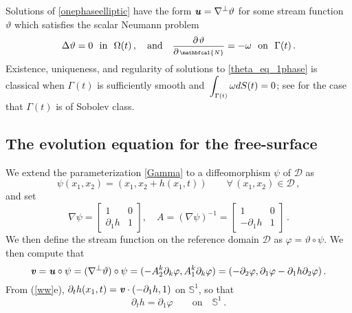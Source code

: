 \documentclass[11pt]{article}
\theoremstyle{plain}
\theoremstyle{definition}
\theoremstyle{definition}
\def\D{{\mathcal D}}
\def\p{\text{\bf\emph{p}}}
\def\u{\text{\bf\emph{u}}}
\def\v{\text{\bf\emph{v}}}
\def\bp{{\partial_1}}
\def\p{{\partial\hspace{1pt}}}
\def\Forall{\forall\hspace{2pt}}
\def\smallexp#1{{\text{\small #1}}}
\def\smallint#1#2{{\text{\small$\displaystyle{}\int_{#1}^{#2}$}}}
\def\dfrac#1#2{\smallexp{$\displaystyle{}\frac{#1}{#2}$}}
\def\nn{{\scriptstyle \mathbfcal{N} }}
\begin{document}
Solutions of  \eqref{onephaseelliptic} have the form $\u = \nabla^\perp \vartheta$ for some stream function $\vartheta$ which satisfies the scalar Neumann problem
\begin{equation}\label{theta_eq_1phase}
\Delta \vartheta = 0 \ \text{ in } \ \Omega(t)\,, \ \ \text{ and } \ \
\dfrac{\p \vartheta}{\p \nn} = -\omega \ \text{ on }\  \Gamma(t)\,.
\end{equation}
Existence, uniqueness, and regularity of solutions to \eqref{theta_eq_1phase} is classical when $\Gamma(t)$ is sufficiently smooth and $\smallint{\Gamma(t)}{}\, \omega dS(t)=0$;
see \cite{ChSh2017} for the case that $\Gamma(t)$ is of Sobolev class.


\subsection{The evolution equation for the free-surface}
We extend the parameterization \eqref{Gamma} to a diffeomorphism $\psi$ of $\D$ as
\begin{equation}\label{psi_ww}
\psi(x_1,x_2) = (x_1, x_2 + h(x_1,t))\qquad \Forall (x_1,x_2) \in \D\,,
\end{equation}
and set
\begin{equation}\label{A_matrix}
\nabla \psi = \left[\begin{matrix}
1 & 0 \\
\partial_1 h & 1
\end{matrix}\right],\quad
A = (\nabla \psi)^{-1} = \left[\begin{matrix}
1 & 0 \\
-\partial_1 h & 1
\end{matrix}\right]\,.
\end{equation}
We then define the stream function  on the reference domain $\D$ as $\varphi = \vartheta \circ \psi$.   We then compute that
$$
\v = \u \circ \psi
= (\nabla^\perp \vartheta)\circ \psi
= (-A^k_2 \partial_k \varphi, A^k_1 \partial_k \varphi)
= (-\partial_2 \varphi, \partial_1 \varphi - \bp h \partial_2 \varphi)\,.
$$
From (\ref{ww}e),
$\partial_t h(x_1,t) = \v \cdot (-\bp h,1) $ on $\mathbb{S}^1$, so that
\begin{equation}\label{h_eq_1phase}
\partial_t h = \bp\varphi \qquad\text{on}\quad \mathbb{S}^1\,.
\end{equation}
\end{document}
